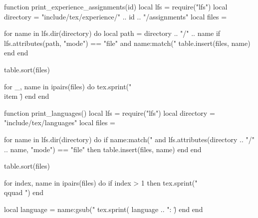 \newcommand{\role}[3]{
  \vspace{4pt}
  \textbf{#1}\hfill #2\\
  {\color{accent}#3}\par
}

\begin{luacode*}
function print_experience_assignments(id)
    local lfs = require("lfs")
    local directory = "include/tex/experience/" .. id .. "/assignments"
    local files = {}

    for name in lfs.dir(directory) do
        local path = directory .. "/" .. name
        if lfs.attributes(path, "mode") == "file"
            and name:match("%
            table.insert(files, name)
        end
    end

    table.sort(files)

    for _, name in ipairs(files) do
        tex.sprint("\\item \")
    end
end
\end{luacode*}

\newcommand{\experience}[1]{%
    \role
        {}
        {--%
         }
        {}%
    \begin{itemize}
        \directlua{
            print_experience_assignments("\luaescapestring{#1}")
        }
    \end{itemize}%
}

\newcommand{\education}[1]{%
    \textbf{}
    \hfill \\
    , 
}

\begin{luacode*}
function print_languages()
    local lfs = require("lfs")
    local directory = "include/tex/languages"
    local files = {}

    for name in lfs.dir(directory) do
        if name:match("%
            and lfs.attributes(directory .. "/" .. name, "mode") == "file" then
            table.insert(files, name)
        end
    end

    table.sort(files)

    for index, name in ipairs(files) do
        if index > 1 then
            tex.sprint("\\qquad ")
        end

        local language = name:gsub("%
        tex.sprint(
            language .. ": \"
        )
    end
end
\end{luacode*}

\newcommand{\languages}{%
    \directlua{print_languages()}%
    \par
}
